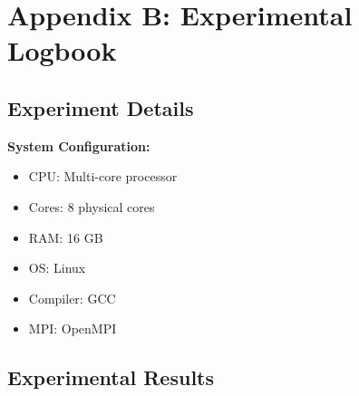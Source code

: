 \documentclass[12pt]{article}
\begin{document}
\newpage

\section*{Appendix B: Experimental Logbook}

\subsection*{Experiment Details}

\textbf{System Configuration:}
\begin{itemize}
    \item CPU: Multi-core processor
    \item Cores: 8 physical cores
    \item RAM: 16 GB
    \item OS: Linux
    \item Compiler: GCC
    \item MPI: OpenMPI
\end{itemize}

\subsection*{Experimental Results}
\end{document}
